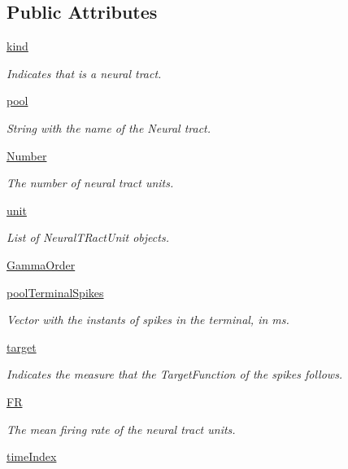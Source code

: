 \subsection*{Public Attributes}
\begin{DoxyCompactItemize}
\item 
\hyperlink{class_neural_tract_1_1_neural_tract_af52b112c86e0c774fa204b7e2154b6aa}{kind}
\begin{DoxyCompactList}\small\item\em Indicates that is a neural tract. \end{DoxyCompactList}\item 
\hyperlink{class_neural_tract_1_1_neural_tract_af0d232b9b86f3bae802b32777d0405d0}{pool}
\begin{DoxyCompactList}\small\item\em String with the name of the Neural tract. \end{DoxyCompactList}\item 
\hyperlink{class_neural_tract_1_1_neural_tract_a9cf4c6df3fb8818e955817bb3ea9ffc4}{Number}
\begin{DoxyCompactList}\small\item\em The number of neural tract units. \end{DoxyCompactList}\item 
\hyperlink{class_neural_tract_1_1_neural_tract_a95db7d0720ec12f091758968476ba240}{unit}
\begin{DoxyCompactList}\small\item\em List of Neural\+T\+Ract\+Unit objects. \end{DoxyCompactList}\item 
\hyperlink{class_neural_tract_1_1_neural_tract_aba5eca22ebc757b1ea009e97c1bd6e36}{Gamma\+Order}
\item 
\hyperlink{class_neural_tract_1_1_neural_tract_a1d104906ff30028e44e377a9e1ed5a3d}{pool\+Terminal\+Spikes}
\begin{DoxyCompactList}\small\item\em Vector with the instants of spikes in the terminal, in ms. \end{DoxyCompactList}\item 
\hyperlink{class_neural_tract_1_1_neural_tract_a637995fcac5bdd80ab1a9d4ea3de7f40}{target}
\begin{DoxyCompactList}\small\item\em Indicates the measure that the Target\+Function of the spikes follows. \end{DoxyCompactList}\item 
\hyperlink{class_neural_tract_1_1_neural_tract_aefbec14cba88a937841314d47f6056c0}{FR}
\begin{DoxyCompactList}\small\item\em The mean firing rate of the neural tract units. \end{DoxyCompactList}\item 
\hyperlink{class_neural_tract_1_1_neural_tract_adcda2b95aa86d4e7eebcc2557aee58cf}{time\+Index}
\end{DoxyCompactItemize}


